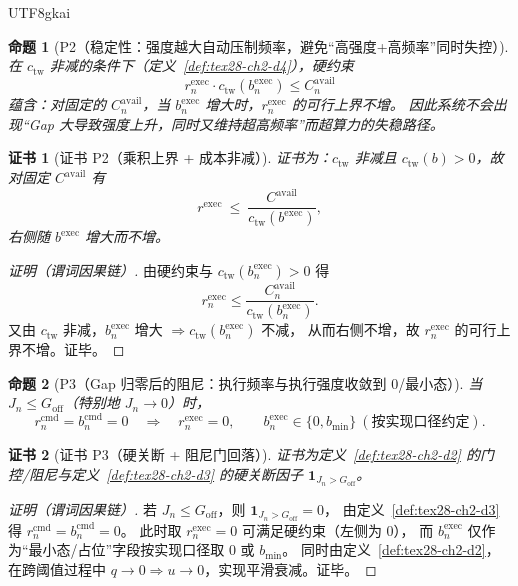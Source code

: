\documentclass[12pt]{article}
\newtheorem{proposition}{命题}[section]
\newtheorem{Certificate}{证书}[section]
\newcommand{\indicator}[1]{\mathbf{1}_{#1}}
\begin{document}
\begin{CJK*}{UTF8}{gkai}
\begin{proposition}[P2（稳定性：强度越大自动压制频率，避免“高强度+高频率”同时失控）]
\label{prop:tex28-ch2-p2}
在 $c_{\mathrm{tw}}$ 非减的条件下（定义~\ref{def:tex28-ch2-d4}），硬约束
\[
  r^{\mathrm{exec}}_n\cdot c_{\mathrm{tw}}(b^{\mathrm{exec}}_n)\le C^{\mathrm{avail}}_n
\]
蕴含：对固定的 $C^{\mathrm{avail}}_n$，当 $b^{\mathrm{exec}}_n$ 增大时，$r^{\mathrm{exec}}_n$ 的可行上界不增。
因此系统不会出现“Gap 大导致强度上升，同时又维持超高频率”而超算力的失稳路径。
\end{proposition}

\begin{Certificate}[证书 P2（乘积上界 + 成本非减）]
\label{cert:tex28-ch2-p2}
证书为：$c_{\mathrm{tw}}$ 非减且 $c_{\mathrm{tw}}(b)>0$，故对固定 $C^{\mathrm{avail}}$ 有
\[
  r^{\mathrm{exec}}\ \le\ \frac{C^{\mathrm{avail}}}{c_{\mathrm{tw}}(b^{\mathrm{exec}})},
\]
右侧随 $b^{\mathrm{exec}}$ 增大而不增。
\end{Certificate}

\begin{proof}[证明（谓词因果链）]
由硬约束与 $c_{\mathrm{tw}}(b^{\mathrm{exec}}_n)>0$ 得
\[
  r^{\mathrm{exec}}_n \le \frac{C^{\mathrm{avail}}_n}{c_{\mathrm{tw}}(b^{\mathrm{exec}}_n)}.
\]
又由 $c_{\mathrm{tw}}$ 非减，$b^{\mathrm{exec}}_n$ 增大 $\Rightarrow c_{\mathrm{tw}}(b^{\mathrm{exec}}_n)$ 不减，
从而右侧不增，故 $r^{\mathrm{exec}}_n$ 的可行上界不增。证毕。
\end{proof}

\begin{proposition}[P3（Gap 归零后的阻尼：执行频率与执行强度收敛到 0/最小态）]
\label{prop:tex28-ch2-p3}
当 $J_n\le G_{\mathrm{off}}$（特别地 $J_n\to 0$）时，
\[
  r^{\mathrm{cmd}}_n=b^{\mathrm{cmd}}_n=0
  \quad\Longrightarrow\quad
  r^{\mathrm{exec}}_n=0,
  \qquad
  b^{\mathrm{exec}}_n\in\{0,b_{\min}\}\ (\text{按实现口径约定}).
\]
\end{proposition}

\begin{Certificate}[证书 P3（硬关断 + 阻尼门回落）]
\label{cert:tex28-ch2-p3}
证书为定义~\ref{def:tex28-ch2-d2} 的门控/阻尼与定义~\ref{def:tex28-ch2-d3} 的硬关断因子 $\indicator{J_n>G_{\mathrm{off}}}$。
\end{Certificate}

\begin{proof}[证明（谓词因果链）]
若 $J_n\le G_{\mathrm{off}}$，则 $\indicator{J_n>G_{\mathrm{off}}}=0$，
由定义~\ref{def:tex28-ch2-d3} 得 $r^{\mathrm{cmd}}_n=b^{\mathrm{cmd}}_n=0$。
此时取 $r^{\mathrm{exec}}_n=0$ 可满足硬约束（左侧为 $0$），
而 $b^{\mathrm{exec}}_n$ 仅作为“最小态/占位”字段按实现口径取 $0$ 或 $b_{\min}$。
同时由定义~\ref{def:tex28-ch2-d2}，在跨阈值过程中 $q\to 0\Rightarrow u\to 0$，实现平滑衰减。证毕。
\end{proof}


\end{CJK*}
\end{document}
